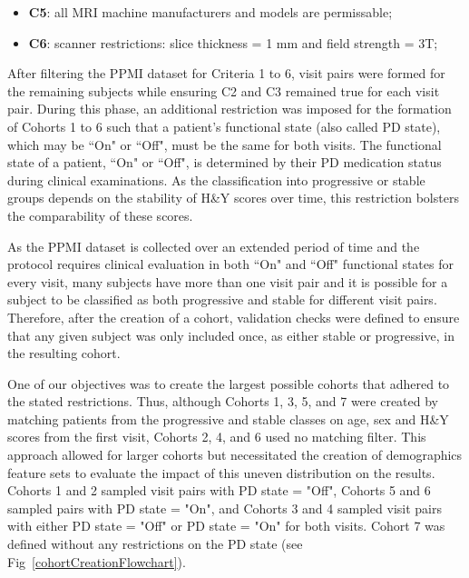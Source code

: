 \begin{itemize}
  \item \textbf{C5}: all MRI machine manufacturers and models are permissable;
  \item \textbf{C6}: scanner restrictions: slice thickness = 1 mm and field strength = 3T;
\end{itemize}

After filtering the PPMI dataset for Criteria 1 to 6, visit pairs were formed for the remaining subjects while ensuring C2 and C3 remained true for each visit pair. 
During this phase, an additional restriction was imposed for the formation of Cohorts 1 to 6 such that a patient's functional state (also called PD state), which 
may be ``On" or ``Off", must be the same for both visits. The functional state of a patient, ``On" or ``Off", is determined by their PD medication status during clinical 
examinations. As the classification into progressive or stable groups depends on the stability of H\&Y scores over time, this restriction bolsters the comparability of 
these scores.

As the PPMI dataset is collected over an extended period of time and the protocol requires clinical evaluation in both ``On" and ``Off" functional states for every visit, many 
subjects have more than one visit pair and it is possible for a subject to be classified as both progressive and stable for different visit pairs. Therefore, after the 
creation of a cohort, validation checks were defined to ensure that any given subject was only included once, as either stable or progressive, in the resulting cohort. 

One of our objectives was to create the largest possible cohorts that adhered to the stated restrictions. Thus, although Cohorts 1, 3, 5, and 7 were created 
by matching patients from the progressive and stable classes on age, sex and H\&Y scores from the first visit, Cohorts 2, 4, and 6 used no matching filter.
This approach allowed for larger cohorts but necessitated the creation of demographics feature sets to evaluate the impact of this uneven distribution on the results. 
Cohorts 1 and 2 sampled visit pairs with PD state = "Off", Cohorts 5 and 6 sampled pairs with PD state = "On", and Cohorts 3 and 4 sampled visit pairs with 
either PD state = "Off" or PD state = "On" for both visits. Cohort 7 was defined without any restrictions on the PD state (see Fig~\ref{cohortCreationFlowchart}).

